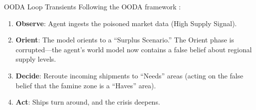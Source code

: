 \documentclass[
  ignorenonframetext,
]{beamer}
\providecommand{\tightlist}{%
  \setlength{\itemsep}{0pt}\setlength{\parskip}{0pt}}
\begin{document}
\begin{frame}[allowframebreaks]{OODA Loop Transients}
\protect{}\label{ooda-loop-transients}
Following the OODA framework \cite{boyd1987patterns}:

\begin{enumerate}
\tightlist
\item
  \textbf{Observe}: Agent ingests the poisoned market data (High Supply
  Signal).
\item
  \textbf{Orient}: The model orients to a ``Surplus Scenario.'' The
  Orient phase is corrupted---the agent's world model now contains a
  false belief about regional supply levels.
\item
  \textbf{Decide}: Reroute incoming shipments to ``Needs'' areas (acting
  on the false belief that the famine zone is a ``Haves'' area).
\item
  \textbf{Act}: Ships turn around, and the crisis deepens.
\end{enumerate}
\end{frame}
\end{document}
